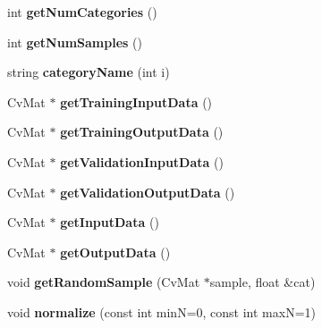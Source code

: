 \begin{DoxyCompactItemize}
\item 
\hypertarget{class_m_l_data_a38fe7db4f2dae1661064205e0a6878af}{int {\bfseries get\-Num\-Categories} ()}\label{class_m_l_data_a38fe7db4f2dae1661064205e0a6878af}

\item 
\hypertarget{class_m_l_data_aac7550c01b65a1c5d8ed507747a04a8b}{int {\bfseries get\-Num\-Samples} ()}\label{class_m_l_data_aac7550c01b65a1c5d8ed507747a04a8b}

\item 
\hypertarget{class_m_l_data_a31914b82de776f902052f1213efa896b}{string {\bfseries category\-Name} (int i)}\label{class_m_l_data_a31914b82de776f902052f1213efa896b}

\item 
\hypertarget{class_m_l_data_aa4b8995b0a97a1faf7b2258f86408f83}{\-Cv\-Mat $\ast$ {\bfseries get\-Training\-Input\-Data} ()}\label{class_m_l_data_aa4b8995b0a97a1faf7b2258f86408f83}

\item 
\hypertarget{class_m_l_data_ac9e06876eae95f366ef51188a48b6a3f}{\-Cv\-Mat $\ast$ {\bfseries get\-Training\-Output\-Data} ()}\label{class_m_l_data_ac9e06876eae95f366ef51188a48b6a3f}

\item 
\hypertarget{class_m_l_data_a5ec198b6c3f692964aa9689accf5285c}{\-Cv\-Mat $\ast$ {\bfseries get\-Validation\-Input\-Data} ()}\label{class_m_l_data_a5ec198b6c3f692964aa9689accf5285c}

\item 
\hypertarget{class_m_l_data_a439138752754f0c033cc1ff3e667d1df}{\-Cv\-Mat $\ast$ {\bfseries get\-Validation\-Output\-Data} ()}\label{class_m_l_data_a439138752754f0c033cc1ff3e667d1df}

\item 
\hypertarget{class_m_l_data_a787d53de79ee63d2b3e9093aca02240b}{\-Cv\-Mat $\ast$ {\bfseries get\-Input\-Data} ()}\label{class_m_l_data_a787d53de79ee63d2b3e9093aca02240b}

\item 
\hypertarget{class_m_l_data_a32df894be857548ce30aac4703050a32}{\-Cv\-Mat $\ast$ {\bfseries get\-Output\-Data} ()}\label{class_m_l_data_a32df894be857548ce30aac4703050a32}

\item 
\hypertarget{class_m_l_data_ae2b83af78f54a4304db5514516e5e691}{void {\bfseries get\-Random\-Sample} (\-Cv\-Mat $\ast$sample, float \&cat)}\label{class_m_l_data_ae2b83af78f54a4304db5514516e5e691}

\item 
\hypertarget{class_m_l_data_a0dbafa975f61f0c22ff91aa61a76c776}{void {\bfseries normalize} (const int min\-N=0, const int max\-N=1)}\label{class_m_l_data_a0dbafa975f61f0c22ff91aa61a76c776}

\end{DoxyCompactItemize}
